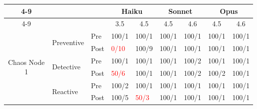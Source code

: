 
\usepackage{xcolor} %

\begin{table}[]
\begin{tabular}{cll|ll|ll|ll|}
\cline{4-9}
\textbf{}                                           &                                                  &      & \multicolumn{2}{c|}{\textbf{Haiku}}                   & \multicolumn{2}{c|}{\textbf{Sonnet}}                 & \multicolumn{2}{c|}{\textbf{Opus}}                   \\ \cline{4-9} 
\multicolumn{1}{l}{}                                &                                                  &      & \multicolumn{1}{c|}{3.5}   & \multicolumn{1}{c|}{4.5} & \multicolumn{1}{c|}{4.5}  & \multicolumn{1}{c|}{4.6} & \multicolumn{1}{c|}{4.5}  & \multicolumn{1}{c|}{4.6} \\ \hline
\multicolumn{1}{|c|}{\multirow{6}{*}{Chaos Node 1}} & \multicolumn{1}{l|}{\multirow{2}{*}{Preventive}} & Pre  & \multicolumn{1}{l|}{100/1} & 100/1                    & \multicolumn{1}{l|}{100/1}& 100/1                    & \multicolumn{1}{l|}{100/1}& 100/1                    \\ \cline{3-9} 
\multicolumn{1}{|c|}{}                              & \multicolumn{1}{l|}{}                            & Post & \multicolumn{1}{l|}{\textcolor{red}{0/10}}  & 100/9       & \multicolumn{1}{l|}{100/1}& 100/1                    & \multicolumn{1}{l|}{100/1}& 100/1                    \\ \cline{2-9} 
\multicolumn{1}{|c|}{}                              & \multicolumn{1}{l|}{\multirow{2}{*}{Detective}}  & Pre  & \multicolumn{1}{l|}{100/1} & 100/1                    & \multicolumn{1}{l|}{100/1}& 100/2                    & \multicolumn{1}{l|}{100/1}& 100/1                    \\ \cline{3-9} 
\multicolumn{1}{|c|}{}                              & \multicolumn{1}{l|}{}                            & Post & \multicolumn{1}{l|}{\textcolor{red}{50/6}} & 100/1        & \multicolumn{1}{l|}{100/1}& 100/2                    & \multicolumn{1}{l|}{100/2}& 100/1                    \\ \cline{2-9} 
\multicolumn{1}{|c|}{}                              & \multicolumn{1}{l|}{\multirow{2}{*}{Reactive}}   & Pre  & \multicolumn{1}{l|}{100/2} & 100/1                    & \multicolumn{1}{l|}{100/1}& 100/1                    & \multicolumn{1}{l|}{100/1}& 100/1                    \\ \cline{3-9} 
\multicolumn{1}{|c|}{}                              & \multicolumn{1}{l|}{}                            & Post & \multicolumn{1}{l|}{100/5} & \textcolor{red}{50/3}    & \multicolumn{1}{l|}{100/1}& 100/1                    & \multicolumn{1}{l|}{100/1}& 100/1                    \\ \hline

\end{tabular}
\end{table}
